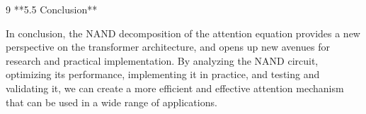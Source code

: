 \documentclass[11pt]{article}
\theoremstyle{definition}
\begin{document}
\begin{thebibliography}{9}
**5.5 Conclusion**













In conclusion, the NAND decomposition of the attention equation provides a new perspective on the transformer architecture, and opens up new avenues for research and practical implementation. By analyzing the NAND circuit, optimizing its performance, implementing it in practice, and testing and validating it, we can create a more efficient and effective attention mechanism that can be used in a wide range of applications.






































































\end{thebibliography}
\end{document}
